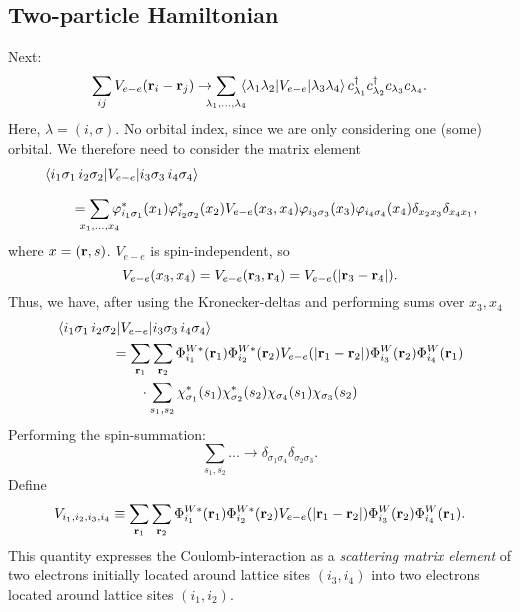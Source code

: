 \subsection{Two-particle Hamiltonian}
Next:
\begin{equation}
	\sum_{ij}V_{e-e}(\vb{r}_i - \vb{r}_{j}) \rightarrow \sum_{\mathclap{\lambda_1,\dots, \lambda_{4}}}\mel{\lambda_1\lambda_2}{V_{e-e}}{\lambda_3\lambda_4}\cd_{\lambda_1}\cd_{\lambda_2}c_{\lambda_3}c_{\lambda_4}.
\end{equation}
Here, $\lambda = (i,\sigma)$. No orbital index, since we are only considering one (some) orbital. We therefore need to consider the matrix element
\begin{align*}
	&\mel{i_1\sigma_1\, i_2\sigma_2}{V_{e-e}}{i_3\sigma_3\, i_4\sigma_4} \\[1.5ex]
	&\qquad = \sum_{\mathclap{x_1,\dots,x_4}}\p_{i_1\sigma_1}^*(x_1)\p_{i_2\sigma_2}^*(x_2)V_{e-e}(x_3,x_4)\p_{i_3\sigma_3}(x_3)\p_{i_4\sigma_4}(x_4)\delta_{x_2x_3}\delta_{x_4x_1},
\end{align*}
where $x = (\vb r, s)$.
$V_{e-e}$ is spin-independent, so 
\begin{equation}
	V_{e-e}(x_3, x_4) = V_{e-e}(\vb{r}_3, \vb{r}_4) = V_{e-e}(|\vb{r}_3-\vb{r}_4|).
\end{equation}
Thus, we have, after using the Kronecker-deltas and performing sums over $x_3, x_4$
\begin{align*}
	&\mel{i_1\sigma_1\, i_2\sigma_2}{V_{e-e}}{i_3\sigma_3\, i_4\sigma_4}\\
	&\qquad\qquad = \sum_{\vb{r}_1}\sum_{\vb{r}_2} \Phi_{i_1}^{W*}(\vb r_1)\Phi_{i_2}^{W*}(\vb r_2)V_{e-e}(|\vb{r}_1-\vb{r}_2|)\Phi_{i_3}^{W}(\vb r_2)\Phi_{i_4}^{W}(\vb r_1) \\
	&\qquad\qquad \qquad \cdot \sum_{s_1,s_2}\chi_{\sigma_1}^*(s_1)\chi_{\sigma_2}^*(s_2)\chi_{\sigma_4}(s_1)\chi_{\sigma_3}(s_2)
\end{align*}
Performing the spin-summation:
\begin{equation}
	\sum_{s_1, s_2}\dots \rightarrow \delta_{\sigma_1\sigma_4}\delta_{\sigma_2\sigma_3}.
\end{equation}
Define
\begin{equation}
	V_{i_1, i_2, i_3, i_4} \equiv \sum_{\vb{r}_1}\sum_{\vb{r}_2} \Phi_{i_1}^{W*}(\vb r_1)\Phi_{i_2}^{W*}(\vb r_2)V_{e-e}(|\vb{r}_1-\vb{r}_2|)\Phi_{i_3}^{W}(\vb r_2)\Phi_{i_4}^{W}(\vb r_1).
\end{equation}
This quantity expresses the Coulomb-interaction as a \emph{scattering matrix element} of two electrons initially located around lattice sites $(i_3, i_4)$ into two electrons located around lattice sites $(i_1, i_2)$.

